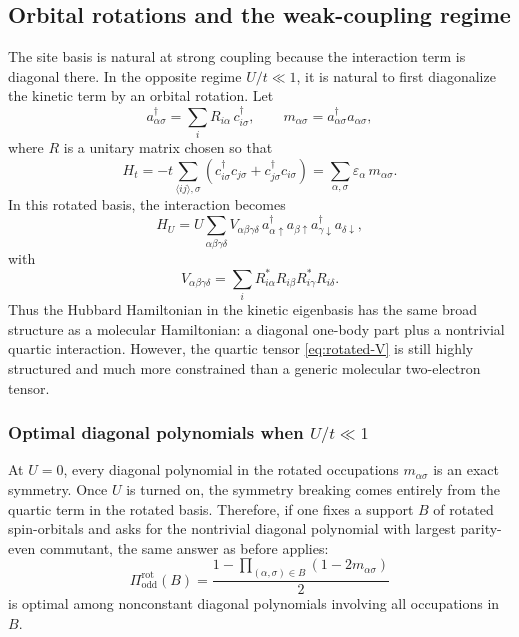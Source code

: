 \documentclass[11pt]{article}
\newcommand{\odd}{\mathrm{odd}}
\theoremstyle{definition}
\theoremstyle{remark}
\begin{document}
\subsection{Orbital rotations and the weak-coupling regime}
The site basis is natural at strong coupling because the interaction term is diagonal there. In the opposite regime $U/t\ll 1$, it is natural to first diagonalize the kinetic term by an orbital rotation. Let
\begin{equation}
  a_{\alpha\sigma}^\dagger=\sum_i R_{i\alpha}\,c_{i\sigma}^\dagger,
  \qquad
  m_{\alpha\sigma}=a_{\alpha\sigma}^\dagger a_{\alpha\sigma},
\end{equation}
where $R$ is a unitary matrix chosen so that
\begin{equation}
  H_t
  =
  -t\sum_{\langle ij\rangle,\sigma}
  \left(c_{i\sigma}^\dagger c_{j\sigma}+c_{j\sigma}^\dagger c_{i\sigma}\right)
  =
  \sum_{\alpha,\sigma}\varepsilon_\alpha\,m_{\alpha\sigma}.
\end{equation}
In this rotated basis, the interaction becomes
\begin{equation}
  H_U
  =
  U\sum_{\alpha\beta\gamma\delta}
  V_{\alpha\beta\gamma\delta}
  \,a_{\alpha\uparrow}^\dagger a_{\beta\uparrow}
  a_{\gamma\downarrow}^\dagger a_{\delta\downarrow},
\end{equation}
with
\begin{equation}
  V_{\alpha\beta\gamma\delta}
  =
  \sum_i R_{i\alpha}^*R_{i\beta}R_{i\gamma}^*R_{i\delta}.
  \label{eq:rotated-V}
\end{equation}
Thus the Hubbard Hamiltonian in the kinetic eigenbasis has the same broad structure as a molecular Hamiltonian: a diagonal one-body part plus a nontrivial quartic interaction. However, the quartic tensor \eqref{eq:rotated-V} is still highly structured and much more constrained than a generic molecular two-electron tensor.

\subsubsection{Optimal diagonal polynomials when $U/t\ll 1$}
At $U=0$, every diagonal polynomial in the rotated occupations $m_{\alpha\sigma}$ is an exact symmetry. Once $U$ is turned on, the symmetry breaking comes entirely from the quartic term in the rotated basis. Therefore, if one fixes a support $B$ of rotated spin-orbitals and asks for the nontrivial diagonal polynomial with largest parity-even commutant, the same answer as before applies:
\begin{equation}
  \Pi_{\odd}^{\mathrm{rot}}(B)
  =
  \frac{1-\prod_{(\alpha,\sigma)\in B}(1-2m_{\alpha\sigma})}{2}
\end{equation}
is optimal among nonconstant diagonal polynomials involving all occupations in $B$.
\end{document}
